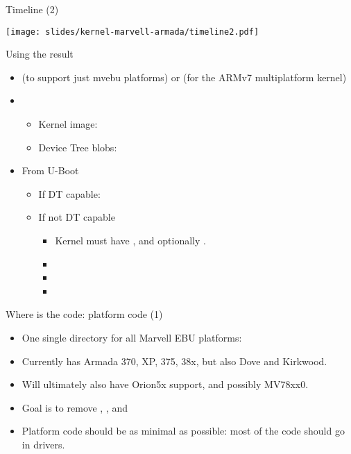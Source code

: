 \begin{frame}{Timeline (2)}
  \begin{center}
    \texttt{[image: slides/kernel-marvell-armada/timeline2.pdf]}
  \end{center}
\end{frame}

\begin{frame}{Using the result}

\begin{itemize}
\item {} (to support just mvebu platforms) or
   (for the ARMv7 multiplatform kernel)
\item {}
  \begin{itemize}
  \item Kernel image: 
  \item Device Tree blobs: 
  \end{itemize}
\item From U-Boot
  \begin{itemize}
  \item If DT capable: 
  \item If not DT capable
    \begin{itemize}
    \item Kernel must have , and
      optionally .
    \item {}
    \item {}
    \item {}
    \end{itemize}
  \end{itemize}
\end{itemize}

\end{frame}

\begin{frame}{Where is the code: platform code (1)}

\begin{itemize}
\item One single directory for all Marvell EBU platforms:
\item Currently has Armada 370, XP, 375, 38x, but also Dove and
  Kirkwood.
\item Will ultimately also have Orion5x support, and possibly MV78xx0.
\item Goal is to remove , ,
   and 
\item Platform code should be as minimal as possible: most of the code
  should go in drivers.
\end{itemize}

\end{frame}

